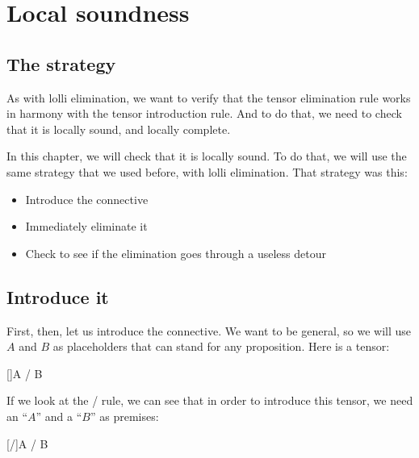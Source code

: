 \documentclass[../../../main.tex]{subfiles}
\begin{document}
\chapter{Local soundness}


\section{The strategy}

As with lolli elimination, we want to verify that the tensor elimination rule works in harmony with the tensor introduction rule. And to do that, we need to check that it is locally sound, and locally complete.

In this chapter, we will check that it is locally sound. To do that, we will use the same strategy that we used before, with lolli elimination. That strategy was this: 

\begin{itemize}
  \item{Introduce the connective}
  \item{Immediately eliminate it} 
  \item{Check to see if the elimination goes through a useless detour}
\end{itemize}



\section{Introduce it}

First, then, let us introduce the connective. We want to be general, so we will use $A$ and $B$ as placeholders that can stand for any proposition. Here is a tensor:

\begin{prooftree*}
  \hypo{}
  []{A \tensor/ B}
\end{prooftree*}

\noindent
If we look at the \tensorIntro/ rule, we can see that in order to introduce this tensor, we need an ``$A$'' and a ``$B$'' as premises:

\begin{prooftree*}
  \hypo{}

  \hypo{}

  [\tensorIntro/]{A \tensor/ B}
\end{prooftree*}
\end{document}

